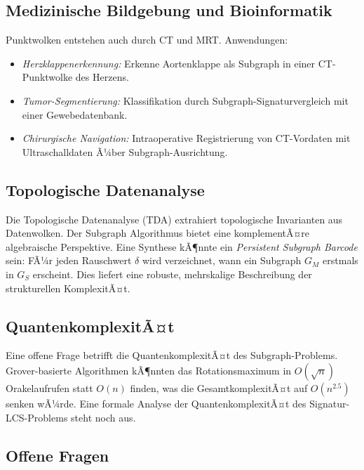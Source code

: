 ﻿\documentclass[a4paper,12pt]{article}
\theoremstyle{definition}
\begin{document}
\subsection{Medizinische Bildgebung und Bioinformatik}

Punktwolken entstehen auch durch CT und MRT. Anwendungen:

\begin{itemize}
  \item \emph{Herzklappenerkennung:} Erkenne Aortenklappe als
        Subgraph in einer CT-Punktwolke des Herzens.
  \item \emph{Tumor-Segmentierung:} Klassifikation durch
        Subgraph-Signaturvergleich mit einer Gewebedatenbank.
  \item \emph{Chirurgische Navigation:} Intraoperative Registrierung
        von CT-Vordaten mit Ultraschalldaten Ã¼ber Subgraph-Ausrichtung.
\end{itemize}

\subsection{Topologische Datenanalyse}

Die Topologische Datenanalyse (TDA) \citep{Carlsson2009} extrahiert
topologische Invarianten aus Datenwolken. Der Subgraph Algorithmus
bietet eine komplementÃ¤re algebraische Perspektive. Eine Synthese
kÃ¶nnte ein \emph{Persistent Subgraph Barcode} sein: FÃ¼r jeden
Rauschwert $\delta$ wird verzeichnet, wann ein Subgraph $G_M$ erstmals
in $G_S$ erscheint. Dies liefert eine robuste, mehrskalige Beschreibung
der strukturellen KomplexitÃ¤t.

\subsection{QuantenkomplexitÃ¤t}

Eine offene Frage betrifft die QuantenkomplexitÃ¤t des
Subgraph-Problems. Grover-basierte Algorithmen \citep{Childs2010}
kÃ¶nnten das Rotationsmaximum in $O(\sqrt{n})$ Orakelaufrufen statt
$O(n)$ finden, was die GesamtkomplexitÃ¤t auf $O(n^{2.5})$ senken wÃ¼rde.
Eine formale Analyse der QuantenkomplexitÃ¤t des
Signatur-LCS-Problems steht noch aus.

\subsection{Offene Fragen}
\end{document}
